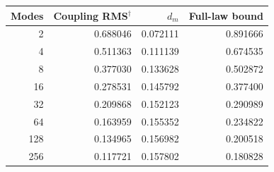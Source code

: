 \begin{tabular}{rrrr}
\toprule
Modes & Coupling RMS$^{\dagger}$ & $d_m$ & Full-law bound \\
\midrule
2 & 0.688046 & 0.072111 & 0.891666 \\
4 & 0.511363 & 0.111139 & 0.674535 \\
8 & 0.377030 & 0.133628 & 0.502872 \\
16 & 0.278531 & 0.145792 & 0.377400 \\
32 & 0.209868 & 0.152123 & 0.290989 \\
64 & 0.163959 & 0.155352 & 0.234822 \\
128 & 0.134965 & 0.156982 & 0.200518 \\
256 & 0.117721 & 0.157802 & 0.180828 \\
\bottomrule
\end{tabular}
